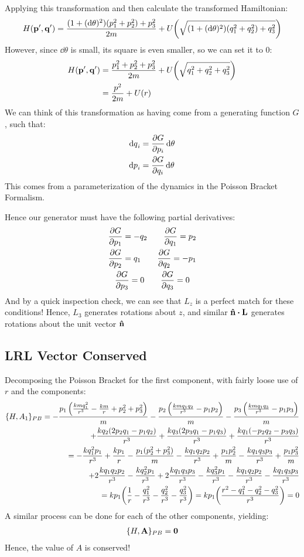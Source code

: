 \documentclass[12pt]{article}
\theoremstyle{plain}
\theoremstyle{definition}
\begin{document}
Applying this transformation and then calculate the transformed Hamiltonian:
\begin{align*}
  H(\vb{p}',\vb{q}')=\frac{(1+(\dd\theta)^2)(p_1^2+p_2^2)+p_3^2}{2m}+
  U\qty(\sqrt{(1+(\dd\theta)^2)(q_1^2+q_2^2)+q_3^2})
\end{align*}
However, since $\dd\theta$ is small, its square is even smaller, so we can set it to $0$:
\begin{align*}
  H(\vb{p}',\vb{q}')&=\frac{p_1^2+p_2^2+p_3^2}{2m}+
  U\qty(\sqrt{q_1^2+q_2^2+q_3^2})\\
  &=\frac{p^2}{2m}+U(r)
\end{align*}
We can think of this transformation as having come from a generating function $G$, such that:
\begin{align*}
  \dd{q}_i&=\pdv{G}{p_i}\dd{\theta}\\
  \dd{p}_i&=\pdv{G}{q_i}\dd{\theta}
\end{align*}
This comes from a parameterization of the dynamics in the Poisson Bracket Formalism.

Hence our generator must have the following partial derivatives:
\begin{gather*}
  \pdv{G}{p_1}=-q_2\qquad\pdv{G}{q_1}= p_2\\
  \pdv{G}{p_2}= q_1\qquad\pdv{G}{q_2}=-p_1\\
  \pdv{G}{p_3}=0\qquad\pdv{G}{q_3}=0
\end{gather*}
And by a quick inspection check, we can see that $L_z$ is a perfect match for these conditions! Hence, $L_3$ generates rotations about $z$, and similar $\vu{n}\vdot\vb{L}$ generates rotations about the unit vector $\vu{n}$
\subsection{LRL Vector Conserved}
Decomposing the Poisson Bracket for the first component, with fairly loose use of $r$ and the components:
\begin{align*}
  \{H,A_1\}_{PB}=
  -\frac{p_1\left(\frac{k m q_1^2}{r^3}-\frac{km}{r}+p_2^2+p_3^2\right)}{m}
  -\frac{p_2 \left(\frac{k m q_1q_2}{r^3}-p_1 p_2\right)}{m}
  -\frac{p_3 \left(\frac{k m q_1 q_3}{r^3}-p_1p_3\right)}{m}\\
  +\frac{k q_2 (2 p_2 q_1-p_1 q_2)}{r^3}
  +\frac{k q_3 (2 p_3q_1-p_1 q_3)}{r^3}+\frac{k q_1 (-p_2 q_2-p_3 q_3)}{r^3}\\
  =-\frac{kq_1^2p_1}{r^3}+\frac{kp_1}{r}-\frac{p_1(p_2^2+p_3^2)}{m}
  -\frac{kq_1q_2p_2}{r^3}+\frac{p_1p_2^2}{m}
  -\frac{kq_1q_3p_3}{r^3}+\frac{p_1p_3^2}{m}\\
  +2\frac{kq_1q_2p_2}{r^3}-\frac{kq_2^2p_1}{r^3}
  +2\frac{kq_1q_3p_3}{r^3}-\frac{kq_3^2p_1}{r^3}
  -\frac{kq_1q_2p_2}{r^3}-\frac{kq_1q_3p_3}{r^3}\\
  =kp_1\qty(\frac{1}{r}-\frac{q_1^2}{r^3}-\frac{q_2^2}{r^3}-\frac{q_3^2}{r^3})
  =kp_1\qty(\frac{r^2-q_1^2-q_2^2-q_3^2}{r^3})=0
\end{align*}
A similar process can be done for each of the other components, yielding:
\begin{align*}
  \{H,\vb{A}\}_{PB}=\vb{0}
\end{align*}
Hence, the value of $A$ is conserved!
\end{document}
